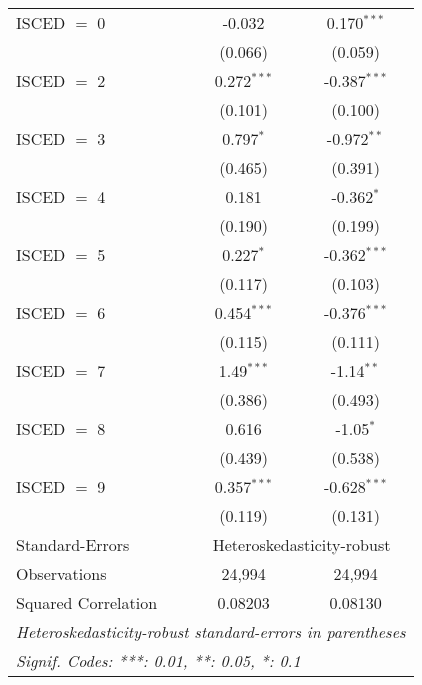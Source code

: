 \begin{table}[htbp!]
\begin{adjustbox}{width = 1\textwidth, max height = 0.95\textheight, center}
\begin{threeparttable}[b]
\begin{tabular}{lcc}
            ISCED $=$ 0          & -0.032        & 0.170$^{***}$\\   
                                 & (0.066)       & (0.059)\\   
            ISCED $=$ 2          & 0.272$^{***}$ & -0.387$^{***}$\\   
                                 & (0.101)       & (0.100)\\   
            ISCED $=$ 3          & 0.797$^{*}$   & -0.972$^{**}$\\   
                                 & (0.465)       & (0.391)\\   
            ISCED $=$ 4          & 0.181         & -0.362$^{*}$\\   
                                 & (0.190)       & (0.199)\\   
            ISCED $=$ 5          & 0.227$^{*}$   & -0.362$^{***}$\\   
                                 & (0.117)       & (0.103)\\   
            ISCED $=$ 6          & 0.454$^{***}$ & -0.376$^{***}$\\   
                                 & (0.115)       & (0.111)\\   
            ISCED $=$ 7          & 1.49$^{***}$  & -1.14$^{**}$\\   
                                 & (0.386)       & (0.493)\\   
            ISCED $=$ 8          & 0.616         & -1.05$^{*}$\\   
                                 & (0.439)       & (0.538)\\   
            ISCED $=$ 9          & 0.357$^{***}$ & -0.628$^{***}$\\   
                                 & (0.119)       & (0.131)\\   
            \midrule 
            Standard-Errors & \multicolumn{2}{c}{Heteroskedasticity-robust} \\ 
            Observations         & 24,994        & 24,994\\  
            Squared Correlation  & 0.08203       & 0.08130\\  
            \midrule \midrule
            \multicolumn{3}{l}{\emph{Heteroskedasticity-robust standard-errors in parentheses}}\\
            \multicolumn{3}{l}{\emph{Signif. Codes: ***: 0.01, **: 0.05, *: 0.1}}\\
         \end{tabular}
         

\end{threeparttable}
\end{adjustbox}
\end{table}
